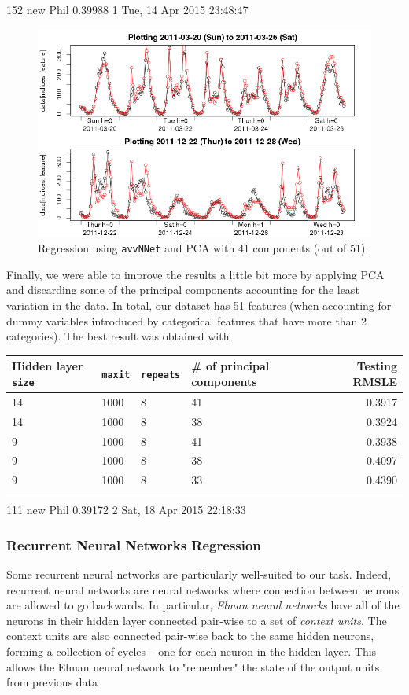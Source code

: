 \documentclass[12pt]{article}
\begin{document}
152	new	Phil	
0.39988
1	Tue, 14 Apr 2015 23:48:47

\begin{figure}[H]
	\centering
	\includegraphics[width=.98\textwidth]{figures/regression_pca_hsize14_maxit1000_numpcs41.png}
	\caption{Regression using \texttt{avvNNet} and PCA with 41 components (out of 51).}
\end{figure}

Finally, we were able to improve the results a little bit more by applying PCA and discarding some of the principal components accounting for the least variation in the data. In total, our dataset has 51 features (when accounting for dummy variables introduced by categorical features that have more than 2 categories). The best result was obtained with 

\begin{table}[H]
	\centering
	\begin{tabular}{llllr}
		Hidden layer \texttt{size} & \texttt{maxit} & \texttt{repeats} & \# of principal components & Testing RMSLE \\
		\hline
		14 & 1000 & 8 & 41 & 0.3917\\
		14 & 1000 & 8 & 38 & 0.3924\\
		9 & 1000 & 8 & 41 & 0.3938\\
		9 & 1000 & 8 & 38 & 0.4097\\
		9 & 1000 & 8 & 33 & 0.4390\\
	\end{tabular}
\end{table}

111	new	Phil	
0.39172
2	Sat, 18 Apr 2015 22:18:33


\subsubsection{Recurrent Neural Networks Regression}
Some recurrent neural networks are particularly well-suited to our task. Indeed, recurrent neural networks are neural networks where connection between neurons are allowed to go backwards. In particular, \emph{Elman neural networks} have all of the neurons in their hidden layer connected pair-wise to a set of \emph{context units}. The context units are also connected pair-wise back to the same hidden neurons, forming a collection of cycles -- one for each neuron in the hidden layer. This allows the Elman neural network to "remember" the state of the output units from previous data
\end{document}
